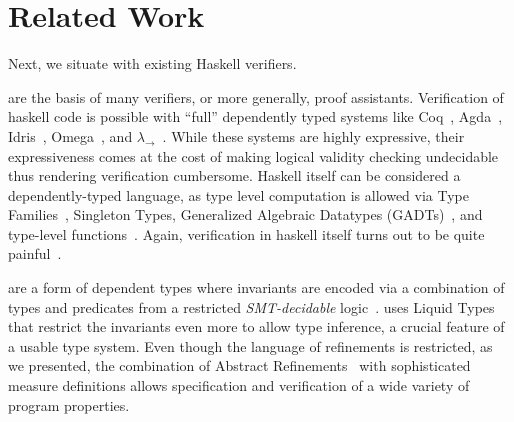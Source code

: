 \section{Related Work}\label{sec:related}

Next, we situate \toolname with 
existing Haskell verifiers.

 are the basis of many verifiers, 
or more generally, proof assistants.
%
Verification of haskell code is possible with
``full'' dependently typed systems like Coq~\cite{coq-book}, 
Agda~\cite{norell07}, Idris~\cite{Brady13}, Omega~\cite{Sheard06}, and
 {$\lambda_\rightarrow$}~\cite{LohMS10}.
 While these systems are highly expressive,
their expressiveness comes at the cost of making logical validity checking undecidable
thus rendering verification cumbersome.	
 Haskell itself can be considered a dependently-typed language,
 as type level computation is allowed via 
 Type Families~\cite{McBride02},
 Singleton Types\cite{Weirich12}, 
 Generalized Algebraic  Datatypes (GADTs)~\cite{JonesVWW06, SchrijversJSV09}, 
 and type-level functions~\cite{ChakravartyKJ05}.
Again, 
verification in haskell itself turns out to be quite painful~\cite{LindleyM13}.

 are a form of dependent types where 
invariants are encoded via a combination of types and predicates
from a restricted \emph{SMT-decidable} 
logic~\cite{Rushby98,pfenningxi98,Dunfield07,GordonTOPLAS2011}. 
%
\toolname uses Liquid Types~\cite{LiquidPLDI09} 
that restrict the invariants even more
to allow type inference, a crucial feature of a usable type system.
%
Even though the language of refinements is restricted,
as we presented, the combination of
Abstract Refinements~\cite{vazou13} 
with sophisticated measure definitions 
allows specification and verification of a wide variety 
of program properties.

